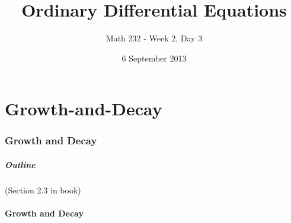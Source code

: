 \part{Growth-and-Decay}
\section{Growth and Decay}

\title{Ordinary Differential Equations}
\subtitle{Math 232 - Week 2, Day 3}
\date{6 September 2013}

\begin{frame}
  \titlepage
\end{frame}

\begin{frame}
  \frametitle{Outline}
  \tableofcontents[ currentsection ]

  (Section 2.3 in book)
\end{frame}


\subsection{Growth and Decay}



